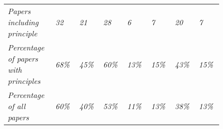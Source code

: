 \begin{landscape}
\begin{ThreePartTable}
\begin{longtable}{P{0.18\linewidth}P{0.1\linewidth}P{0.1\linewidth}P{0.1\linewidth}P{0.1\linewidth}P{0.1\linewidth}P{0.1\linewidth}P{0.1\linewidth}}
    \midrule
        \textit{Papers including principle} & \textit{32} & \textit{21} & \textit{28} & \textit{6} & \textit{7} & \textit{20} & \textit{7} \\ 
        \textit{Percentage of papers with principles} & \textit{68\%} & \textit{45\%} & \textit{60\%} & \textit{13\%} & \textit{15\%} & \textit{43\%} & \textit{15\%} \\ 
        \textit{Percentage of all papers} & \textit{60\%} & \textit{40\%} & \textit{53\%} & \textit{11\%} & \textit{13\%} & \textit{38\%} & \textit{13\%} \\  
\end{longtable}

\end{ThreePartTable}

\end{landscape}

\normalsize